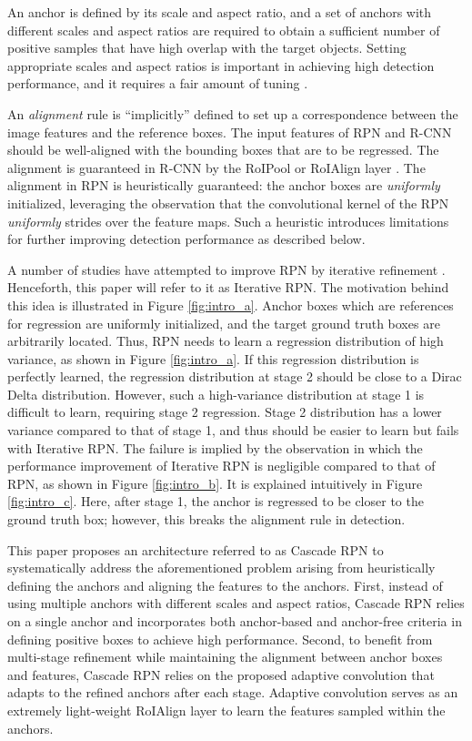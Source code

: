\documentclass{article}
\begin{document}
	An anchor is defined by its scale and aspect ratio, and a set of anchors with different scales and aspect ratios are required to obtain a sufficient number of positive samples that have high overlap with the target objects. Setting appropriate scales and aspect ratios is important in achieving high detection performance, and it requires a fair amount of tuning \citep{Lin_2017_ICCV, NIPS2015_5638}. 
	
	An \textit{alignment} rule is \enquote{implicitly} defined to set up a correspondence between the image features and the reference boxes. The input features of RPN and R-CNN should be well-aligned with the bounding boxes that are to be regressed. The alignment is guaranteed in R-CNN by the RoIPool \citep{NIPS2015_5638} or RoIAlign \citep{He_2017_ICCV} layer . The alignment in RPN is heuristically guaranteed: the anchor boxes are \textit{uniformly} initialized, leveraging the observation that the convolutional kernel of the RPN \textit{uniformly} strides over the feature maps. Such a heuristic introduces limitations for further improving detection performance as described below.
	
	A number of studies have attempted to improve RPN by iterative refinement \citep{gidaris2016attend,zhong2017cascade}. Henceforth, this paper will refer to it as Iterative RPN. The motivation behind this idea is illustrated in Figure \ref{fig:intro_a}. Anchor boxes which are references for regression are uniformly initialized, and the target ground truth boxes are arbitrarily located. Thus, RPN needs to learn a regression distribution of high variance, as shown in Figure \ref{fig:intro_a}. If this regression distribution is perfectly learned, the regression distribution at stage 2 should be close to a Dirac Delta distribution. However, such a high-variance distribution at stage 1 is difficult to learn, requiring stage 2 regression. Stage 2 distribution has a lower variance compared to that of stage 1, and thus should be easier to learn but fails with Iterative RPN. The failure is implied by the observation in which the performance improvement of Iterative RPN is negligible compared to that of RPN, as shown in Figure \ref{fig:intro_b}. It is explained intuitively in Figure \ref{fig:intro_c}. Here, after stage 1, the anchor is regressed to be closer to the ground truth box; however, this breaks the alignment rule in detection. 
	
	This paper proposes an architecture referred to as Cascade RPN to systematically address the aforementioned problem arising from heuristically defining the anchors and aligning the features to the anchors. First, instead of using multiple anchors with different scales and aspect ratios, Cascade RPN relies on a single anchor and incorporates both anchor-based and anchor-free criteria in defining positive boxes to achieve high performance. Second, to benefit from multi-stage refinement while maintaining the alignment between anchor boxes and features, Cascade RPN relies on the proposed adaptive convolution that adapts to the refined anchors after each stage. Adaptive convolution serves as an extremely light-weight RoIAlign layer \citep{He_2017_ICCV} to learn the features sampled within the anchors.
	
\end{document}
